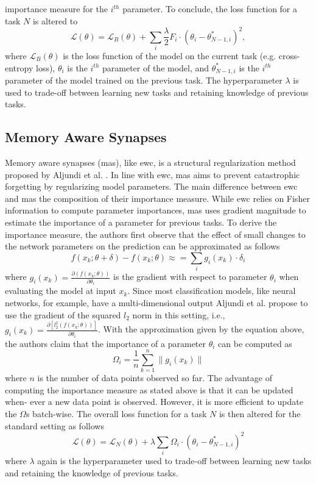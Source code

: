 importance measure for the $i^{th}$ parameter. To conclude, the loss function for a task $N$ is altered to
\begin{equation}
    \mathcal{L}(\theta) = \mathcal{L}_B(\theta) + \sum_i \frac{\lambda}{2} F_i \cdot (\theta_i - \theta^*_{N-1,i})^2,
\end{equation}
where $\mathcal{L}_B(\theta)$ is the loss function of the model on the current task (e.g. cross-entropy loss), $\theta_i$ is the $i^{th}$ parameter of the model,
and $\theta^*_{N-1,i}$ is the $i^{th}$ parameter of the model trained on the previous task. The hyperparameter $\lambda$ is used to trade-off between
learning new tasks and retaining knowledge of previous tasks.

\subsection{Memory Aware Synapses}
\label{sec:Related_work:Continual_Learning:MAS}
Memory aware synapses (\gls{mas}), like \gls{ewc}, is a structural regularization method proposed by Aljundi et al. \cite{aljundi2018memory}. 
In line with \gls{ewc}, \gls{mas} aims to prevent catastrophic forgetting by regularizing model parameters. The main difference between \gls{ewc} and
\gls{mas} the composition of their importance measure. While \gls{ewc} relies on Fisher information to compute parameter importances, \gls{mas} uses
gradient magnitude to estimate the importance of a parameter for previous tasks. To derive the importance measure, the authors first observe that the
effect of small changes to the network parameters on the prediction can be approximated as follows
\begin{equation}
    f(x_k; \theta + \delta) - f(x_k; \theta) \approx = \sum_i g_i(x_k) \cdot \delta_i
\end{equation}
where $g_i(x_k) = \frac{\partial(f(x_k;\theta))}{\partial \theta_i}$  is the gradient with respect to parameter $\theta_i$ when evaluating the model at
input $x_k$. Since most classification models, like neural networks, for example, have a multi-dimensional output Aljundi et al. propose to use the gradient
of the squared $l_2$ norm in this setting, i.e., $g_i(x_k) =  \frac{\partial[l^2_2(f(x_k;\theta))]}{\partial \theta_i}$. With the approximation given by the
equation above, the authors claim that the importance of a parameter $\theta_i$ can be computed as
\begin{equation}
    \Omega_i = \frac{1}{n} \sum_{k=1}^n \lVert g_i(x_k) \rVert
\end{equation}
where $n$ is the number of data points observed so far. The advantage of computing the importance measure as stated above is that it can be updated when-
ever a new data point is observed. However, it is more efficient to update the $\Omega$s batch-wise. The overall loss function for a task $N$ is
then altered for the standard setting as follows
\begin{equation}
    \mathcal{L}(\theta) = \mathcal{L}_N(\theta) + \lambda \sum_i \Omega_i \cdot (\theta_i - \theta^*_{N-1,i})^2
\end{equation}
where $\lambda$ again is the hyperparameter used to trade-off between learning new tasks and retaining the knowledge of previous tasks.


